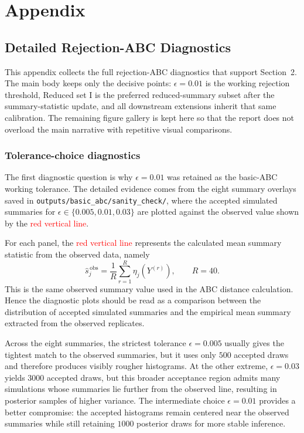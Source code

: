 \documentclass[11pt]{article}
\begin{document}
\appendix
\renewcommand{\thesection}{Appendix \Alph{section}}
\renewcommand{\thesubsection}{\Alph{section}.\arabic{subsection}}
\addcontentsline{toc}{section}{\thesection}
\section*{\thesection}
\label{app:supporting-material}

\subsection{Detailed Rejection-ABC Diagnostics}
\label{app:rejection-diagnostics}

This appendix collects the full rejection-ABC diagnostics that support Section~2. The main body keeps only the decisive points: $\epsilon=0.01$ is the working rejection threshold, Reduced set I is the preferred reduced-summary subset after the summary-statistic update, and all downstream extensions inherit that same calibration. The remaining figure gallery is kept here so that the report does not overload the main narrative with repetitive visual comparisons.

\subsubsection{Tolerance-choice diagnostics}

The first diagnostic question is why $\epsilon = 0.01$ was retained as the basic-ABC working tolerance. The detailed evidence comes from the eight summary overlays saved in \texttt{outputs/basic\_abc/sanity\_check/}, where the accepted simulated summaries for $\epsilon \in \{0.005,0.01,0.03\}$ are plotted against the observed value shown by the \textcolor{red}{red vertical line}.

For each panel, the \textcolor{red}{red vertical line} represents the calculated mean summary statistic from the observed data, namely
\[
\widehat{s}^{\,\mathrm{obs}}_j = \frac{1}{R}\sum_{r=1}^{R}\eta_j\!\left(Y^{(r)}\right),
\qquad R = 40.
\]
This is the same observed summary value used in the ABC distance calculation. Hence the diagnostic plots should be read as a comparison between the distribution of accepted simulated summaries and the empirical mean summary extracted from the observed replicates.

Across the eight summaries, the strictest tolerance $\epsilon = 0.005$ usually gives the tightest match to the observed summaries, but it uses only $500$ accepted draws and therefore produces visibly rougher histograms. At the other extreme, $\epsilon = 0.03$ yields $3000$ accepted draws, but this broader acceptance region admits many simulations whose summaries lie further from the observed line, resulting in posterior samples of higher variance. The intermediate choice $\epsilon = 0.01$ provides a better compromise: the accepted histograms remain centered near the observed summaries while still retaining $1000$ posterior draws for more stable inference.
\end{document}
